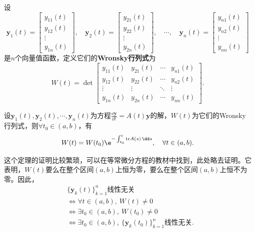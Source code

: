 \begin{definition}[Wronsky行列式]
    设
    \begin{equation}
        \mathbf{y}_1(t)=\begin{bmatrix}
        y_{11}(t)\\
        y_{12}(t)\\
        \vdots\\
        y_{1n}(t)
        \end{bmatrix},\quad \mathbf{y}_2(t)=\begin{bmatrix}
        y_{21}(t)\\
        y_{22}(t)\\
        \vdots\\
        y_{2n}(t)
        \end{bmatrix},\quad \cdots,\quad \mathbf{y}_n(t)=\begin{bmatrix}
        y_{n1}(t)\\
        y_{n2}(t)\\
        \vdots\\
        y_{nn}(t)
        \end{bmatrix}
    \end{equation}
    是$n$个向量值函数，定义它们的\textbf{Wronsky行列式}为
    \begin{equation}
        W(t)=\det\begin{bmatrix}
        y_{11}(t) & y_{21}(t) & \cdots & y_{n1}(t)\\
        y_{12}(t) & y_{22}(t) & \cdots & y_{n2}(t)\\
        \vdots & \vdots & \ddots & \vdots\\
        y_{1n}(t) & y_{2n}(t) & \cdots & y_{nn}(t)
        \end{bmatrix}.
    \end{equation}
\end{definition}

\begin{theorem}[Liouville公式]
    设$\mathbf{y}_1(t),\mathbf{y}_2(t),\cdots,\mathbf{y}_n(t)$为方程$\displaystyle\frac{\dd\mathbf{y}}{\dd t}=A(t)\mathbf{y}$的解，$W(t)$为它们的Wronsky行列式，则$\forall t_0\in (a,b)$，有
    \begin{equation}
        W(t)=W(t_0)\e^{-\int_{t_0}^t \mathrm{tr}A(s)\,\dd s},\quad \forall t\in(a,b).
    \end{equation}
\end{theorem}

这个定理的证明比较繁琐，可以在\cite{ode}等常微分方程的教材中找到，此处略去证明。它表明，$W(t)$要么在整个区间$(a,b)$上恒为零，要么在整个区间$(a,b)$上恒不为零。因此，
\begin{align}
    &\{\mathbf{y}_k(t)\}_{k=1}^n\text{线性无关}\nonumber\\
    &\iff \forall t\in(a,b),\ W(t)\neq 0\nonumber\\
    &\iff \exists t_0\in(a,b),\ W(t_0)\neq 0\nonumber\\
    &\iff \exists t_0\in(a,b),\ \{\mathbf{y}_k(t_0)\}_{k=1}^n\text{线性无关}.
\end{align}


